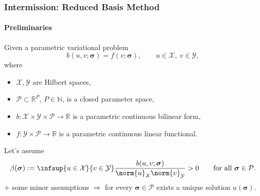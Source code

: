 \begin{frame}[t]
    \frametitle{Intermission: Reduced Basis Method}
    \framesubtitle{Preliminaries}

    Given a parametric variational problem
    \begin{equation}
        b(u, v; \bm \sigma) = f(v; \bm \sigma), \qquad u \in \mathcal X,~v \in \mathcal Y,
    \end{equation}
    where
    \begin{itemize}
        \item $\mathcal X, \mathcal Y$ are Hilbert spaces,
        \item $\mathcal P \subset \mathbb{R}^{P}$, $P \in \mathbb{N}$, is a closed parameter space,
        \item $b \colon \mathcal X \times \mathcal Y \times \mathcal P \to \mathbb{R}$ is a parametric continuous bilinear form,
        \item $f \colon \mathcal Y \times \mathcal P \to \mathbb{R}$ is a parametric continuous linear functional.
    \end{itemize}

    Let's assume
    \begin{equation}
        \beta(\bm \sigma) := \infsup{u \in \mathcal X}{v \in \mathcal Y} \frac{b(u, v; \bm \sigma)}{\norm{u}_{\mathcal X}\norm{v}_{\mathcal Y}}  > 0 \qquad \text{for all } \bm \sigma \in \mathcal P.
    \end{equation}
    $+$ some minor assumptions $\Rightarrow$ for every $\bm \sigma \in \mathcal P$ exists a unique solution $u(\bm \sigma)$.
\end{frame}

